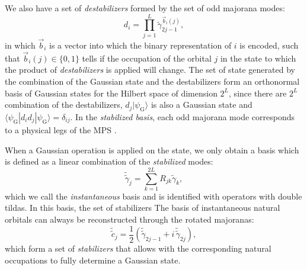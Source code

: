 \documentclass[a4paper, twocolumn, superscriptaddress, longbibliography]{revtex4-2}
\begin{document}
	We also have a	set of \emph{destabilizers} formed by the set of odd majorana modes:
	\begin{equation}
	d^{}_i = \prod_{j=1}^{L}\tilde{\gamma}_{2j-1}^{\vec{b}_{i}(j)},
	\end{equation}
	in which $\vec{b}_i$ is a vector into which the binary representation of $i$ is encoded, such that $\vec{b}_{i}(j) \in \{0,1\}$ tells if the occupation of the orbital $j$ in the state to which the product of \emph{destabilizers} is applied will change. The set of state generated by the combination of the Gaussian state and the destabilizers form an orthonormal basis of Gaussian states for the Hilbert space of dimension $2^{L}$, since there are $2^L$ combination of the destabilizers, $d_j |\psi_{\mathrm{G}}\rangle$ is also a Gaussian state and $\langle \psi_{\mathrm{G}}^{}|d_i d_j |\psi_{\mathrm{G}}\rangle = \delta_{ij}$. In the \emph{stabilized basis}, each odd majorana mode corresponds to a physical legs of the MPS .

	When a Gaussian operation is applied on the state, we only obtain a basis which is defined as a linear combination of the \emph{stabilized} modes:
	\begin{equation}
		\tilde{\tilde{\gamma}}_j = \sum_{k=1}^{2L} R_{jk}\tilde{\gamma}_{k},
	\end{equation}
	which we call the \emph{instantaneous} basis and is identified with operators with double tildas. In this basis, the set of stabilizers
	The basis of instantaneous natural orbitals can always be reconstructed through the rotated majoranas:
	\begin{equation}
		\tilde{\tilde{c}}_{j}^{} = \frac{1}{2}\left(\tilde{\tilde{\gamma}}_{2j-1} + i\,\tilde{\tilde{\gamma}}_{2j}\right),
	\end{equation}
	which form a set of \emph{stabilizers} that allows with the corresponding natural occupations to fully determine a Gaussian state.
\end{document}
